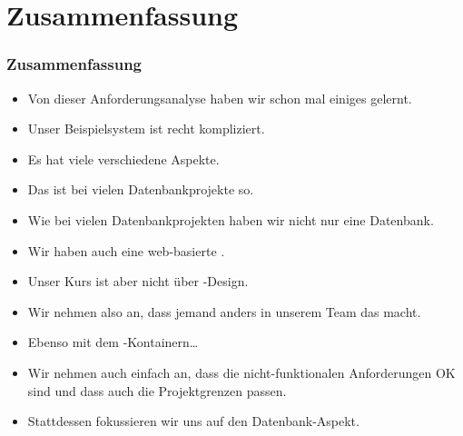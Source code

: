 \documentclass[aspectratio=169,mathserif,notheorems]{beamer}%
\begin{document}
\section{Zusammenfassung}%
%
\begin{frame}%
\frametitle{Zusammenfassung}%
\begin{itemize}%
%
\item Von dieser Anforderungsanalyse haben wir schon mal einiges gelernt.%
%
\item<2-> Unser Beispielsystem ist recht kompliziert.%
%
\item<3-> Es hat viele verschiedene Aspekte.%
%
\item<4-> Das ist bei vielen Datenbankprojekte so.%
%
\item<5-> Wie bei vielen Datenbankprojekten haben wir nicht nur eine Datenbank.%
%
\item<6-> Wir haben auch eine web-basierte .%
%
\item<7-> Unser Kurs ist aber nicht über -Design.%
%
\item<8-> Wir nehmen also an, dass jemand anders in unserem Team das macht.%
%
\item<9-> Ebenso mit dem \docker-Kontainern\dots%
%
\item<10-> Wir nehmen auch einfach an, dass die nicht-funktionalen Anforderungen OK sind und dass auch die Projektgrenzen passen.%
%
\item<11-> Stattdessen fokussieren wir uns auf den Datenbank-Aspekt.
\end{itemize}%
\end{frame}
%
\end{document}
